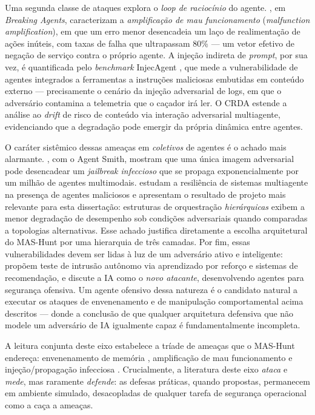 Uma segunda classe de ataques explora o \textit{loop de raciocínio} do agente.
, em \textit{Breaking Agents}, caracterizam a
\textit{amplificação de mau funcionamento} (\textit{malfunction amplification}),
em que um erro menor desencadeia um laço de realimentação de ações inúteis, com
taxas de falha que ultrapassam 80\% --- um vetor efetivo de negação de serviço
contra o próprio agente. A injeção indireta de \textit{prompt}, por sua vez, é
quantificada pelo \textit{benchmark} InjecAgent \cite{zhan2024injecagent}, que
mede a vulnerabilidade de agentes integrados a ferramentas a instruções
maliciosas embutidas em conteúdo externo --- precisamente o cenário da
injeção adversarial de logs, em que o adversário contamina a telemetria que o
caçador irá ler. O CRDA \cite{liu2024crda} estende a análise ao \textit{drift} de
risco de conteúdo via interação adversarial multiagente, evidenciando que a
degradação pode emergir da própria dinâmica entre agentes.

O caráter sistêmico dessas ameaças em \textit{coletivos} de agentes é o achado
mais alarmante. , com o Agent Smith, mostram que uma
única imagem adversarial pode desencadear um \textit{jailbreak infeccioso} que se
propaga exponencialmente por um milhão de agentes multimodais.
 estudam a resiliência de sistemas multiagente na
presença de agentes maliciosos e apresentam o resultado de projeto mais relevante
para esta dissertação: estruturas de orquestração \textit{hierárquicas} exibem a
menor degradação de desempenho sob condições adversariais quando comparadas a
topologias alternativas. Esse achado justifica diretamente a escolha arquitetural
do MAS-Hunt por uma hierarquia de três camadas. Por fim, essas vulnerabilidades
devem ser lidas à luz de um adversário ativo e inteligente:
 propõem teste de intrusão autônomo via
aprendizado por reforço e sistemas de recomendação, e 
discute a IA como o \textit{novo atacante}, desenvolvendo agentes para segurança
ofensiva. Um agente ofensivo dessa natureza é o candidato natural a executar os
ataques de envenenamento e de manipulação comportamental acima descritos --- donde
a conclusão de que qualquer arquitetura defensiva que não modele um adversário de
IA igualmente capaz é fundamentalmente incompleta.

A leitura conjunta deste eixo estabelece a tríade de ameaças que o MAS-Hunt
endereça: envenenamento de memória \cite{NEURIPS2024_eb113910}, amplificação de
mau funcionamento \cite{zhang2024breaking} e injeção/propagação infecciosa
\cite{zhan2024injecagent,gu2024agent,huang2024resilience}. Crucialmente, a
literatura deste eixo \textit{ataca} e \textit{mede}, mas raramente \textit{defende}:
as defesas práticas, quando propostas, permanecem em ambiente simulado, desacopladas
de qualquer tarefa de segurança operacional como a caça a ameaças.

